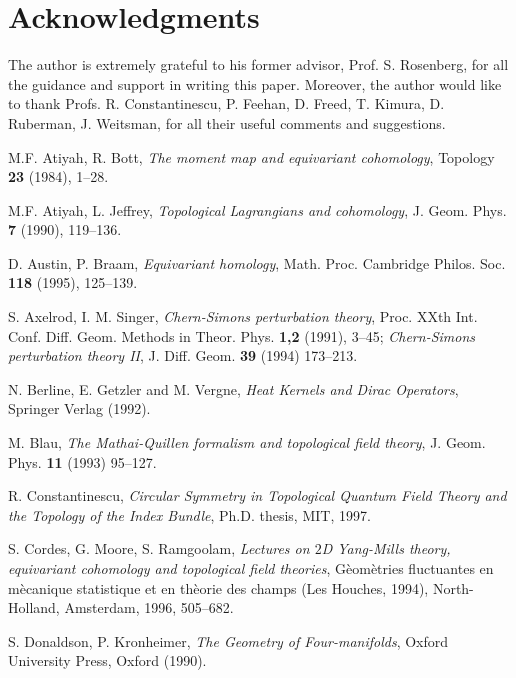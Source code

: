 \documentclass[a4paper,12pt,reqno,sumlimits]{amsart}
\theoremstyle{plain}
\theoremstyle{definition}
\newcommand{\1}{{\bf 1}}
\numberwithin{equation}{section}
\begin{document}

\section*{Acknowledgments}

The author is extremely grateful to his former advisor, Prof. S. Rosenberg,
for all the guidance and support in writing this paper. Moreover, the author
would like to thank Profs. R. Constantinescu, P.  Feehan, D. Freed, T.
Kimura, D. Ruberman, J. Weitsman, for all their useful comments and
suggestions.


\begin{thebibliography}{999}
  

 M.F. Atiyah, R. Bott, {\em The moment map and equivariant
    cohomology}, Topology {\bf 23} (1984), 1--28.
  
 M.F. Atiyah, L. Jeffrey, {\em Topological Lagrangians and
    cohomology}, J. Geom. Phys. {\bf 7} (1990), 119--136.
  
 D. Austin, P. Braam, {\em Equivariant homology}, Math. Proc.
  Cambridge Philos. Soc. {\bf 118} (1995), 125--139.
  
 S. Axelrod, I. M. Singer, {\em Chern-Simons perturbation
    theory}, Proc. XXth Int. Conf. Diff. Geom. Methods in Theor. Phys. {\bf
    1,2} (1991), 3--45; {\em Chern-Simons perturbation theory II}, J. Diff.
  Geom. {\bf 39} (1994) 173--213.
  
 N. Berline, E. Getzler and M. Vergne, {\em Heat Kernels and
    Dirac Operators}, Springer Verlag (1992).
  
 M. Blau, {\em The Mathai-Quillen formalism and topological
    field theory}, J. Geom. Phys. {\bf 11} (1993) 95--127.
  
 R. Constantinescu, {\em Circular Symmetry in Topological
    Quantum Field Theory and the Topology of the Index Bundle}, Ph.D. thesis,
  MIT, 1997.
  
 S. Cordes, G. Moore, S. Ramgoolam, {\em Lectures on $2$D
    Yang-Mills theory, equivariant cohomology and topological field
    theories}, G\`eom\`etries fluctuantes en m\`ecanique statistique et en
  th\`eorie des champs (Les Houches, 1994), North-Holland, Amsterdam, 1996,
  505--682.
  
 S. Donaldson, P. Kronheimer, {\em The Geometry of
    Four-manifolds}, Oxford University Press, Oxford (1990).
  

\end{thebibliography}
\end{document}
